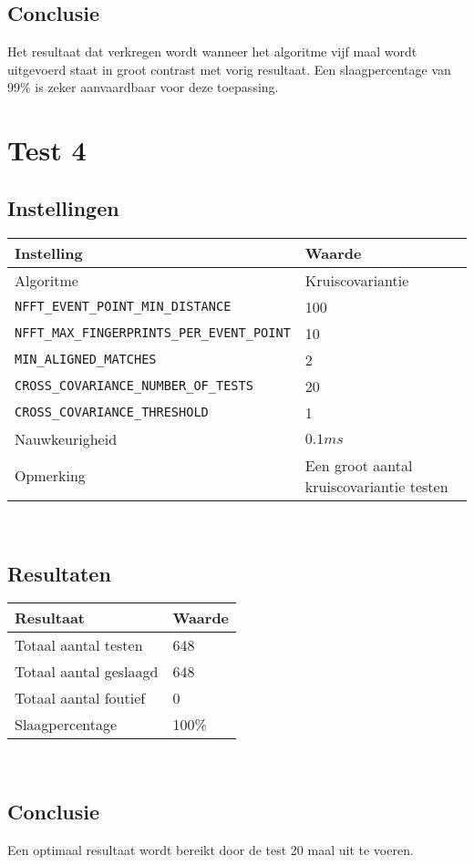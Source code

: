 \subsection*{Conclusie}

Het resultaat dat verkregen wordt wanneer het algoritme vijf maal wordt uitgevoerd staat in groot contrast met vorig resultaat. Een slaagpercentage van 99\% is zeker aanvaardbaar voor deze toepassing.

\section*{Test 4}

\subsection*{Instellingen}

\begin{tabular}{ l  l}
	\hline
	\textbf{Instelling} & \textbf{Waarde} \\
	\hline
	Algoritme & Kruiscovariantie \\
	\texttt{NFFT\_EVENT\_POINT\_MIN\_DISTANCE} & 100 \\
	\texttt{NFFT\_MAX\_FINGERPRINTS\_PER\_EVENT\_POINT} & 10 \\
	\texttt{MIN\_ALIGNED\_MATCHES} & 2 \\
	\texttt{CROSS\_COVARIANCE\_NUMBER\_OF\_TESTS} & 20 \\
	\texttt{CROSS\_COVARIANCE\_THRESHOLD} & 1 \\
	Nauwkeurigheid & $0.1ms$ \\
	Opmerking & Een groot aantal kruiscovariantie testen
\end{tabular}\\

\subsection*{Resultaten}

\begin{tabular}{ l  l}
	\hline
	\textbf{Resultaat} & \textbf{Waarde} \\
	\hline
	Totaal aantal testen & 648 \\
	Totaal aantal geslaagd & 648 \\
	Totaal aantal foutief & 0 \\
	Slaagpercentage & 100\% \\
\end{tabular}\\

\subsection*{Conclusie}

Een optimaal resultaat wordt bereikt door de test 20 maal uit te voeren.